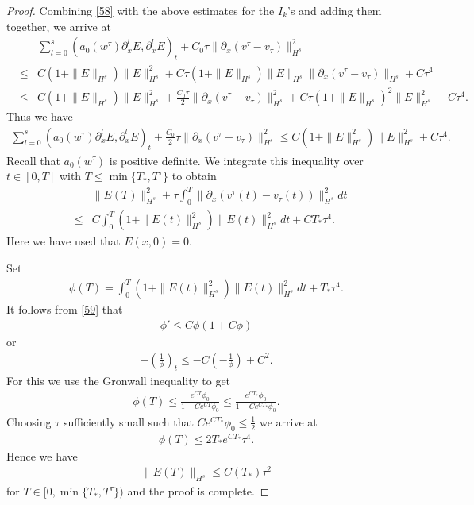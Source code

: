 \documentclass{article}
\theoremstyle{plain}
\begin{document}
\begin{proof}
Combining \eqref{58} with the above estimates for the $I_k$'s and adding them together, we arrive at
\begin{eqnarray*}
 && \sum_{l=0}^s  (a_0(w^\tau) \partial^l_x E,\partial^l_x E)_t + C_0 \tau \|\partial_x (v^\tau-v_\tau)\|_{H^s}^2 \\
 &\le& C (1+\|E\|_{H^s})\|E\|_{H^s}^2 + C \tau(1+\|E\|_{H^s})\|E\|_{H^s} \|\partial_x(v^\tau-v_\tau)\|_{H^s} + C \tau^4  \\
 &\le& C (1+\|E\|_{H^s})\|E\|_{H^s}^2 + \frac{C_0\tau}{2} \|\partial_x(v^\tau-v_\tau)\|_{H^s}^2 + C \tau (1+\|E\|_{H^s})^2 \|E\|_{H^s}^2 + C \tau^4.
\end{eqnarray*}
Thus we have
\begin{eqnarray*}
  \sum_{l=0}^s  (a_0(w^\tau) \partial^l_x E,\partial^l_x E)_t + \frac{C_0}{2} \tau \|\partial_x (v^\tau-v_\tau)\|_{H^s}^2 \le   C (1+\|E\|_{H^s}^2)\|E\|_{H^s}^2 + C \tau^4.
\end{eqnarray*}
Recall that $a_0(w^\tau)$ is positive definite.
We integrate this inequality over $t \in [0,T]$ with $T \le \min \{T_*,T^\tau\}$ to obtain
\begin{eqnarray} \label{59}
 && \|E(T)\|_{H^s}^2 + \tau \int_0^T \|\partial_x(v^\tau(t)-v_\tau(t))\|_{H^s}^2 dt \nonumber \\
& \le &  C\int_0^T (1+\|E(t)\|_{H^s}^2)\|E(t)\|_{H^s}^2 dt +CT_* \tau^4.
\end{eqnarray}
Here we have used that $E(x, 0)=0$.

Set
\begin{eqnarray*}
  \phi(T) =  \int_0^T (1+\|E(t)\|_{H^s}^2)\|E(t)\|_{H^s}^2 dt + T_* \tau^4.
\end{eqnarray*}
It follows from \eqref{59} that
\begin{eqnarray*}
  \phi' \le C  \phi(1+C\phi)
\end{eqnarray*}
or
\begin{eqnarray*}
  -(\frac{1}{\phi})_t \le -C (-\frac{1}{\phi})+C^2.
\end{eqnarray*}
For this we use the Gronwall inequality to get
\begin{eqnarray*}
  \phi(T) \le \frac{e^{CT} \phi_0}{1-C e^{CT}  \phi_0}\le\frac{e^{CT_*} \phi_0}{1-C e^{CT_*} \phi_0} .
\end{eqnarray*}
Choosing $\tau$ sufficiently small such that $C e^{CT_*} \phi_0 \le \frac{1}{2}$ we arrive at
\begin{eqnarray*}
  \phi(T) \le 2T_*e^{CT_*}\tau^4.
\end{eqnarray*}
Hence we have
\begin{eqnarray*}
  \|E(T)\|_{H^s} \le C(T_*) \tau^2
\end{eqnarray*}
for $T \in [0,\min\{T_*,T^\tau\})$ and the proof is complete.
\end{proof}



\end{document}
